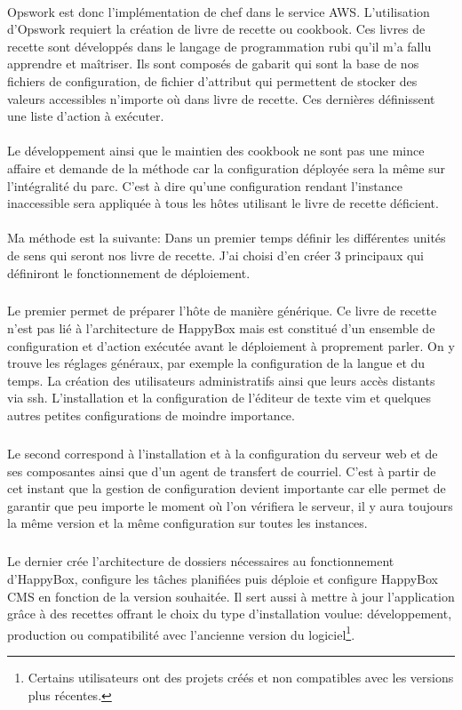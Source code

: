 \documentclass[11pt, a4paper ]{article}
\begin{document}
\begin{spacing}{1.5}
\paragraph{}
Opswork est donc l'implémentation de chef dans le service AWS. L'utilisation d'Opswork requiert la création de livre de recette ou cookbook. Ces livres de recette sont développés dans le langage de programmation rubi qu'il m'a fallu apprendre et maîtriser. Ils sont composés de gabarit qui sont la base de nos fichiers de configuration, de fichier d’attribut qui permettent de stocker des valeurs accessibles n'importe où dans livre de recette. Ces dernières définissent une liste d'action à exécuter.
\paragraph{}
Le développement ainsi que le maintien des cookbook ne sont pas une mince affaire et demande de la méthode car la configuration déployée sera la même sur l'intégralité du parc. C'est à dire qu'une configuration rendant l'instance inaccessible sera appliquée à tous les hôtes utilisant le livre de recette déficient.
\paragraph{}
Ma méthode est la suivante: Dans un premier temps définir les différentes unités de sens qui seront nos livre de recette. J'ai choisi d'en créer 3 principaux qui définiront le fonctionnement de déploiement.
\subparagraph{}
Le premier permet de préparer l’hôte de manière générique. Ce livre de recette n'est pas lié à l'architecture de HappyBox mais est constitué d'un ensemble de configuration et d'action exécutée avant le déploiement à proprement parler. On y trouve les réglages généraux, par exemple la configuration de la langue et du temps. La création des utilisateurs administratifs ainsi que leurs accès distants via ssh. L'installation et la configuration de l’éditeur de texte vim et quelques autres petites configurations de moindre importance.
\subparagraph{}
Le second correspond à l'installation et à la configuration du serveur web et de ses composantes ainsi que d'un agent de transfert de courriel. C'est à partir de cet instant que la gestion de configuration devient importante car elle permet de garantir que peu importe le moment où l'on vérifiera le serveur, il y aura toujours la même version et la même configuration sur toutes les instances.
\subparagraph{}
Le dernier crée l'architecture de dossiers nécessaires au fonctionnement d'HappyBox, configure les tâches planifiées puis déploie et configure HappyBox CMS en fonction de la version souhaitée. Il sert aussi à mettre à jour l'application grâce à des recettes offrant le choix du type d'installation voulue: développement, production ou compatibilité avec l'ancienne version du logiciel\footnote{Certains utilisateurs ont des projets créés et non compatibles avec les versions plus récentes.}.

\end{spacing}
\end{document}
